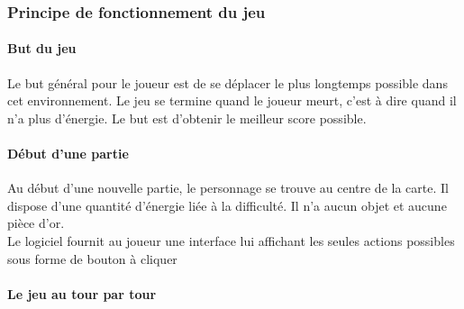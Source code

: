 \documentclass[11pt]{article}
\begin{document}
\subsubsection{Principe de fonctionnement du jeu}

\paragraph{But du jeu}

Le but général pour le joueur est de se déplacer le plus longtemps possible dans cet environnement. Le jeu se termine quand le joueur meurt, c'est à dire quand il n'a plus d'énergie. Le but est d'obtenir le meilleur score possible.

\paragraph{Début d'une partie}

Au début d'une nouvelle partie, le personnage se trouve au centre de la carte. Il dispose d'une quantité d'énergie liée à la difficulté. Il n'a aucun objet et aucune pièce d'or.\\
Le logiciel fournit au joueur une interface lui affichant les seules actions possibles sous forme de bouton à cliquer

\paragraph{Le jeu au tour par tour}
\end{document}
